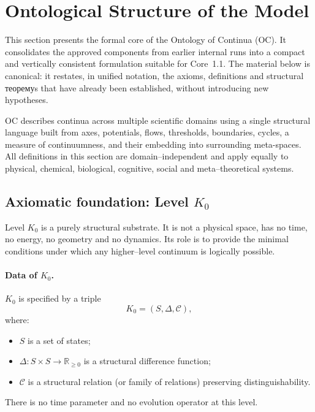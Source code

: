 
\section{Ontological Structure of the Model}
\label{sec:model}

This section presents the formal core of the Ontology of Continua (OC).
It consolidates the approved components from earlier internal runs into a compact and vertically consistent formulation suitable for Core~1.1.
The material below is canonical: it restates, in unified notation, the axioms, definitions and structural теоремуs that have already been established, without introducing new hypotheses.

OC describes continua across multiple scientific domains using a single structural language built from
axes, potentials, flows, thresholds, boundaries, cycles, a measure of continuumness, and their embedding into surrounding meta-spaces.
All definitions in this section are domain–independent and apply equally to physical, chemical, biological, cognitive, social and meta–theoretical systems.

\subsection{Axiomatic foundation: Level \texorpdfstring{$K_0$}{K0}}

Level \(K_0\) is a purely structural substrate.
It is not a physical space, has no time, no energy, no geometry and no dynamics.
Its role is to provide the minimal conditions under which any higher–level continuum is logically possible.

\paragraph{Data of \texorpdfstring{\(K_0\)}{K0}.}
\(K_0\) is specified by a triple
\[
    K_0 = (S,\Delta,\mathcal{C}),
\]
where:
\begin{itemize}
    \item \(S\) is a set of states;
    \item \(\Delta : S \times S \to \mathbb{R}_{\ge 0}\) is a structural difference function;
    \item \(\mathcal{C}\) is a structural relation (or family of relations) preserving distinguishability.
\end{itemize}
There is no time parameter and no evolution operator at this level.

